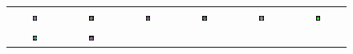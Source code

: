 \documentclass[12pt]{article}
\begin{document}
\begin{figure}[htb]
 \begin{center}
 \begin{tabular}{cccccc}
      \includegraphics[width=0.1\textwidth]{figures/wholebrain/sub1/axial0028} &
      \includegraphics[width=0.1\textwidth]{figures/wholebrain/sub1/axial0034} &
      \includegraphics[width=0.1\textwidth]{figures/wholebrain/sub2/axial0028} &
      \includegraphics[width=0.1\textwidth]{figures/wholebrain/sub2/axial0034} &
      \includegraphics[width=0.1\textwidth]{figures/wholebrain/sub5/axial0028} &
      \includegraphics[width=0.1\textwidth]{figures/wholebrain/sub5/axial0034} \\

      \includegraphics[width=0.1\textwidth]{figures/wholebrain/sub1/saggital0029} &
      \includegraphics[width=0.1\textwidth]{figures/wholebrain/sub1/coronal0029} &


\end{tabular}
\end{center}
\end{figure}
\end{document}
